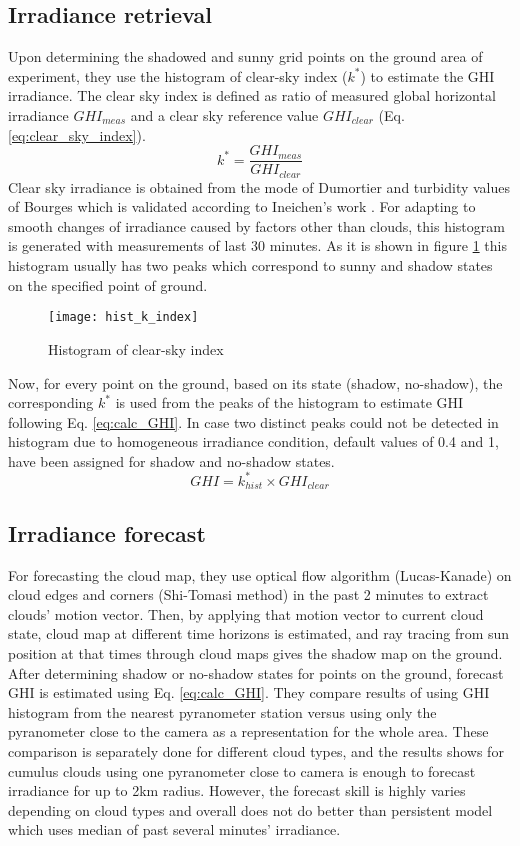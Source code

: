 \subsection{Irradiance retrieval}
Upon determining the shadowed and sunny grid points on the ground area of experiment, they use the histogram of clear-sky index ($k^{*}$) to estimate the GHI irradiance. The clear sky index is defined as ratio of measured global horizontal irradiance $GHI_{meas}$ and a clear sky reference value $GHI_{clear}$ (Eq. \ref{eq:clear_sky_index}).
\begin{equation}
\label{eq:clear_sky_index}
k^{*} = \frac{GHI_{meas}}{GHI_{clear}}
\end{equation}
Clear sky irradiance is obtained from the mode of Dumortier \cite{clear_sky_model} and turbidity values of Bourges \cite{turbidity} which is validated according to Ineichen's work \cite{Ineichen}.
For adapting to smooth changes of irradiance caused by factors other than clouds, this histogram is generated with measurements of last 30 minutes. As it is shown in figure \ref{fig:hist_k_index} this histogram usually has two peaks which correspond to sunny and shadow states on the specified point of ground. 
\begin{figure}[h!]
\caption{Histogram of clear-sky index}
\label{fig:hist_k_index}
\texttt{[image: hist\_k\_index]}
\centering
\end{figure} 

Now, for every point on the ground, based on its state (shadow, no-shadow), the corresponding $k^{*}$ is used from the peaks of the histogram to estimate GHI following Eq. \ref{eq:calc_GHI}. In case two distinct peaks could not be detected in histogram due to homogeneous irradiance condition, default values of 0.4 and 1, have been assigned for shadow and no-shadow states.
\begin{equation}
\label{eq:calc_GHI}
GHI = k^{*}_{hist} \times GHI_{clear}
\end{equation}

\subsection{Irradiance forecast}
For forecasting the cloud map, they use optical flow algorithm (Lucas-Kanade) on cloud edges and corners (Shi-Tomasi method) in the past 2 minutes to extract clouds' motion vector. Then, by applying that motion vector to current cloud state, cloud map at different time horizons is estimated, and ray tracing from sun position at that times through cloud maps gives the shadow map on the ground. After determining shadow or no-shadow states for points on the ground, forecast GHI is estimated using Eq. \ref{eq:calc_GHI}. They compare results of using GHI histogram from the nearest pyranometer station versus using only the pyranometer close to the camera as a representation for the whole area. These comparison is separately done for different cloud types, and the results shows for cumulus clouds using one pyranometer close to camera is enough to forecast irradiance for up to 2km radius. However, the forecast skill is highly varies depending on cloud types and overall does not do better than persistent model which uses median of past several minutes' irradiance.


